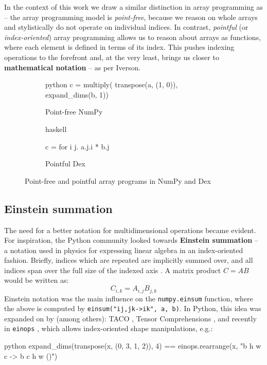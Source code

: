 In the context of this work we draw a similar distinction in array programming as \textcite{paszke2021getting} -- the array programming model is \textit{point-free}, because we reason on whole arrays and stylistically do not operate on individual indices. In contrast, \textit{pointful} (or \textit{index-oriented}) array programming allows us to reason about arrays as functions, where each element is defined in terms of its index. This pushes indexing operations to the forefront and, at the very least, brings us closer to \textbf{mathematical 
notation} -- as per Iverson.

\begin{figure}[h]
\centering
\begin{subfigure}{.4\textwidth}
  \centering
    \begin{cminted}{python}
c = multiply(
  transpose(a, (1, 0)),
  expand_dims(b, 1))
    \end{cminted}
      \caption{Point-free NumPy}
\end{subfigure}%
\begin{subfigure}{.4\textwidth}
  \centering
  \begin{cminted}{haskell}

c = for i j. a.j.i * b.j
  
  \end{cminted}
  \caption{Pointful Dex}
\end{subfigure}
\caption{Point-free and pointful array programs in NumPy and Dex}
\label{fig:point-arrays}
\end{figure}


\subsection{Einstein summation}

The need for a better notation for multidimensional operations became evident. For inspiration, the Python community looked towards \textbf{Einstein summation} -- a notation used in physics for expressing linear algebra in an index-oriented fashion. Briefly, indices which are repeated are implicitly summed over, and all indices span over the full size of the indexed axis \cite{aahlander2002einstein}. A matrix product $C = AB$ would be written as:
$$ C_{i,k} = A_{i,j} B_{j,k} $$
Einstein notation was the main influence on the \texttt{numpy.einsum} function, where the above is computed by \texttt{einsum("ij,jk->ik", a, b)}. In Python, this idea was expanded on by (among others): TACO \cite{kjolstad2017tensor}, Tensor Comprehensions \cite{vasilache2018tensor}, and recently in \texttt{einops} \cite{rogozhnikov2021einops}, which allows index-oriented shape manipulations, e.g.:
\begin{center}
\begin{cminted}{python}
expand_dims(transpose(x, (0, 3, 1, 2)), 4) == einops.rearrange(x, "b h w c -> b c h w ()")
\end{cminted}
\end{center}


